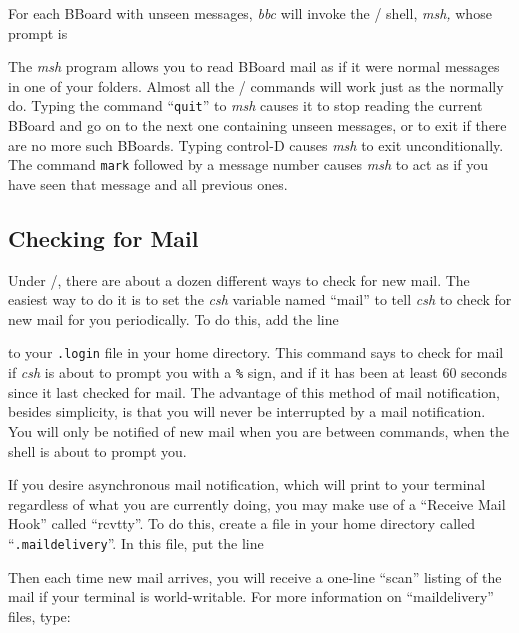 For each BBoard with unseen messages, {\it bbc\/} will invoke the \MH/
shell, {\it msh,} whose prompt is


The {\it msh\/} program allows you to read BBoard mail as if it were normal
messages in one of your folders.  Almost all the \MH/ commands will work
just as the normally do.  Typing the command ``{\tt quit}'' to {\it msh\/}
causes it to stop reading the current BBoard and go on to the next one
containing unseen messages, or to exit if there are no more such BBoards.
Typing control-D causes {\it msh\/} to exit unconditionally.  The command
{\tt mark} followed by a message number causes {\it msh\/} to act as if you
have seen that message and all previous ones.

\subsection{Checking for Mail}

Under \unix/, there are about a dozen different ways to check for new mail.
The easiest way to do it is to set the {\it csh\/} variable named ``mail''
to tell {\it csh\/} to check for new mail for you periodically.  To do this,
add the line


to your {\tt .login} file in your home directory.  This command says to
check for mail if {\it csh\/} is about to prompt you with a {\tt\%} sign,
and if it has been at least 60 seconds since it last checked for mail.
The advantage of this method of mail notification, besides simplicity, is
that you will never be interrupted by a mail notification.  You will only be
notified of new mail when you are between commands, when the shell is about to
prompt you.

If you desire asynchronous mail notification, which will print to your
terminal regardless of what you are currently doing, you may make use of a
``Receive Mail Hook'' called ``rcvtty''.  To do this, create a file in your
home directory called ``{\tt .maildelivery}''.  In this file, put the line


Then each time new mail arrives, you will receive a one-line ``scan''
listing of the mail if your terminal is world-writable. For more information
on ``maildelivery'' files, type:



